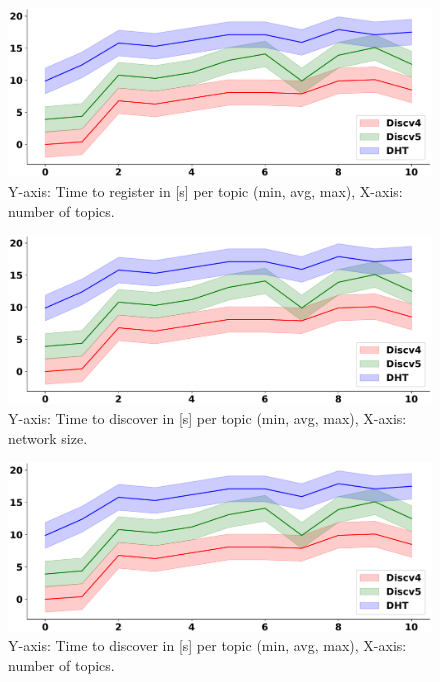 \begin{figure}[!h]
\includegraphics[width=\linewidth]{img/placeholder_max_min}
\caption{Y-axis: Time to register in [s] per topic (min, avg, max), X-axis: number of topics.} 
\label{fig:fairness_time_to_register_topics}
\end{figure}

\begin{figure}[!h]
\includegraphics[width=\linewidth]{img/placeholder_max_min}
\caption{Y-axis: Time to discover in [s] per topic (min, avg, max), X-axis: network size.} 
\label{fig:fairness_time_to_discover_size}
\end{figure}

\begin{figure}[!h]
\includegraphics[width=\linewidth]{img/placeholder_max_min}
\caption{Y-axis: Time to discover in [s] per topic (min, avg, max), X-axis: number of topics.} 
\label{fig:fairness_time_to_discover_topics}
\end{figure}

